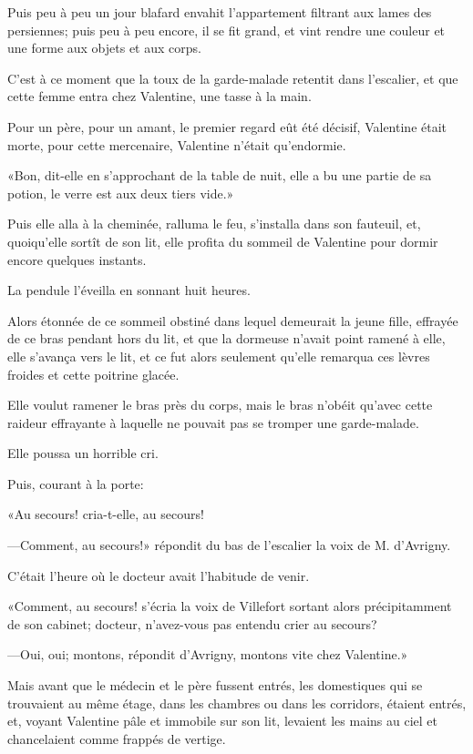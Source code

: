 Puis peu à peu un jour blafard envahit l'appartement filtrant aux lames des persiennes; puis peu à peu encore, il se fit grand, et vint rendre une couleur et une forme aux objets et aux corps. 

C'est à ce moment que la toux de la garde-malade retentit dans l'escalier, et que cette femme entra chez Valentine, une tasse à la main. 

Pour un père, pour un amant, le premier regard eût été décisif, Valentine était morte, pour cette mercenaire, Valentine n'était qu'endormie. 

«Bon, dit-elle en s'approchant de la table de nuit, elle a bu une partie de sa potion, le verre est aux deux tiers vide.» 

Puis elle alla à la cheminée, ralluma le feu, s'installa dans son fauteuil, et, quoiqu'elle sortît de son lit, elle profita du sommeil de Valentine pour dormir encore quelques instants. 

La pendule l'éveilla en sonnant huit heures. 

Alors étonnée de ce sommeil obstiné dans lequel demeurait la jeune fille, effrayée de ce bras pendant hors du lit, et que la dormeuse n'avait point ramené à elle, elle s'avança vers le lit, et ce fut alors seulement qu'elle remarqua ces lèvres froides et cette poitrine glacée. 

Elle voulut ramener le bras près du corps, mais le bras n'obéit qu'avec cette raideur effrayante à laquelle ne pouvait pas se tromper une garde-malade. 

Elle poussa un horrible cri. 

Puis, courant à la porte: 

«Au secours! cria-t-elle, au secours! 

—Comment, au secours!» répondit du bas de l'escalier la voix de M. d'Avrigny. 

C'était l'heure où le docteur avait l'habitude de venir. 

«Comment, au secours! s'écria la voix de Villefort sortant alors précipitamment de son cabinet; docteur, n'avez-vous pas entendu crier au secours? 

—Oui, oui; montons, répondit d'Avrigny, montons vite chez Valentine.» 

Mais avant que le médecin et le père fussent entrés, les domestiques qui se trouvaient au même étage, dans les chambres ou dans les corridors, étaient entrés, et, voyant Valentine pâle et immobile sur son lit, levaient les mains au ciel et chancelaient comme frappés de vertige. 

